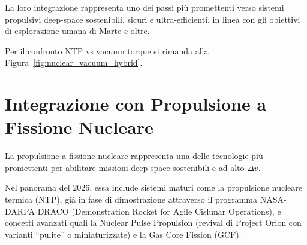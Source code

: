 \documentclass[11pt,a4paper]{article}
\let\oldref\ref
\renewcommand{\ref}{\protect\oldref}
\theoremstyle{plain}
\theoremstyle{definition}
\begin{document}
\vspace{0.2cm}


La loro integrazione rappresenta uno dei passi più promettenti verso sistemi propulsivi deep-space sostenibili, sicuri e ultra-efficienti, in linea con gli obiettivi di esplorazione umana di Marte e oltre.

\vspace{0.1cm}

Per il confronto NTP vs vacuum torque si rimanda alla Figura~\ref{fig:nuclear_vacuum_hybrid}.







\vspace{0.7cm}








\section{Integrazione con Propulsione a Fissione Nucleare}

\vspace{0.2cm}

La propulsione a fissione nucleare rappresenta una delle tecnologie più promettenti per abilitare missioni deep-space sostenibili e ad alto $\Delta v$. 

\vspace{0.2cm}


Nel panorama del 2026, essa include sistemi maturi come la propulsione nucleare termica (NTP), già in fase di dimostrazione attraverso il programma NASA-DARPA DRACO (Demonstration Rocket for Agile Cislunar Operations), e concetti avanzati quali la Nuclear Pulse Propulsion (revival di Project Orion con varianti “pulite” o miniaturizzate) e la Gas Core Fission (GCF).

\vspace{0.4cm}
\end{document}
